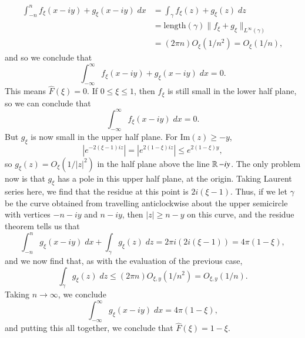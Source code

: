 \begin{example}
    \begin{align*}
        \int_{-n}^n f_\xi(x - iy) + g_\xi(x - iy)\; dx &= \int_\gamma f_\xi(z) + g_\xi(z)\; dz\\
        &= \text{length}(\gamma) \| f_\xi + g_\xi \|_{L^\infty(\gamma)}\\
        &= (2 \pi n) O_\xi(1/n^2) = O_\xi(1/n),
    \end{align*}
    and so we conclude that
    \[ \int_{-\infty}^\infty f_\xi(x - iy) + g_\xi(x - iy)\; dx = 0. \]
    This means $\widehat{F}(\xi) = 0$. If $0 \leq \xi \leq 1$, then $f_\xi$ is still small in the lower half plane, so we can conclude that
    \[ \int_{-\infty}^\infty f_\xi(x - iy)\; dx = 0. \]
    But $g_\xi$ is now small in the upper half plane. For $\text{Im}(z) \geq -y$,
    \[ |e^{-2(\xi - 1)iz}| = |e^{2(1 - \xi)iz}| \leq e^{2(1 - \xi)y}, \] 
    so $g_\xi(z) = O_\xi(1/|z|^2)$ in the half plane above the line $\operatorname{\mathbb{R}} - iy$. The only problem now is that $g_\xi$ has a pole in this upper half plane, at the origin. Taking Laurent series here, we find that the residue at this point is $2i(\xi - 1)$. Thus, if we let $\gamma$ be the curve obtained from travelling anticlockwise about the upper semicircle with vertices $-n - iy$ and $n - iy$, then $|z| \geq n - y$ on this curve, and the residue theorem tells us that
    \[ \int_{-n}^n g_\xi(x - iy)\; dx + \int_\gamma g_\xi(z)\; dz = 2\pi i (2i(\xi - 1)) = 4 \pi (1 - \xi), \]
    and we now find that, as with the evaluation of the previous case,
    \[ \int_\gamma g_\xi(z)\; dz \leq (2 \pi n) O_{\xi,y}(1/n^2) = O_{\xi,y}(1/n). \]
    Taking $n \to \infty$, we conclude
    \[ \int_{-\infty}^\infty g_\xi(x - iy)\; dx = 4 \pi (1 - \xi), \]
    and putting this all together, we conclude that $\widehat{F}(\xi) = 1 - \xi$.
\end{example}

